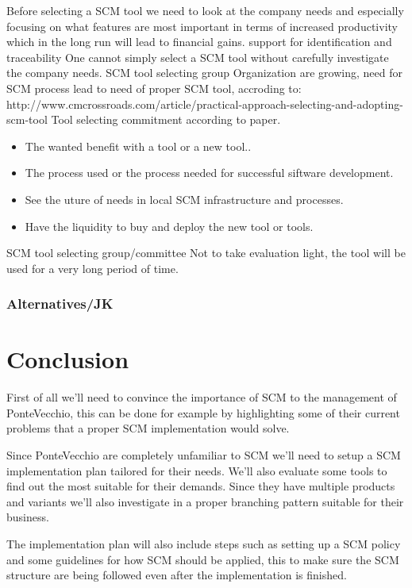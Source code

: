\documentclass[10pt]{article}
\begin{document}
Before selecting a SCM tool we need to look at the company needs and especially focusing on what features are most important in terms of increased productivity which in the long run will lead to financial gains. 
support for identification and traceability
One cannot simply select a SCM tool without carefully investigate the company needs.
SCM tool selecting group
Organization are growing, need for SCM process lead to need of proper SCM tool,  accroding to: http://www.cmcrossroads.com/article/practical-approach-selecting-and-adopting-scm-tool
Tool selecting commitment according to paper. 
\begin{itemize}
\item The wanted benefit with a tool or a new tool..
\item The process used or the process needed for successful siftware development.
\item See the uture of needs in local SCM infrastructure and processes.
\item Have the liquidity to buy and deploy the new tool or tools.
\end{itemize}
SCM tool selecting group/committee
Not to take evaluation light, the tool will be used for a very long period of time.
\subsubsection{Alternatives/JK}

\section{Conclusion}

First of all we’ll need to convince the importance of SCM to the management of PonteVecchio, this can be done for example by highlighting some of their current problems that a proper SCM implementation would solve.

\noindent Since PonteVecchio are completely unfamiliar to SCM we’ll need to setup a SCM implementation plan tailored for their needs. We’ll also evaluate some tools to find out the most suitable for their demands. 
Since they have multiple products and variants we’ll also investigate in a proper branching pattern suitable for their business.

\noindent The implementation plan will also include steps such as setting up a SCM policy and some guidelines for how SCM should be applied, this to make sure the SCM structure are being followed even after the implementation is finished.
\end{document}
